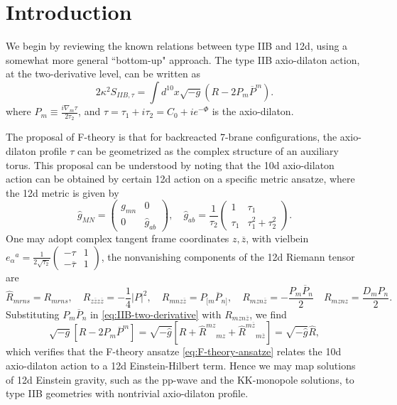 \section{Introduction}
We begin by reviewing the known relations between type IIB and 12d, using a somewhat more general ``bottom-up" approach.
The type IIB axio-dilaton action, at the two-derivative level, can be written as
\begin{equation}
2\kappa^2 S_{IIB,\tau}
= \int d^{10}x \sqrt{-g} \left(R - 2 P_m \overline{P}^m\right).
\label{eq:IIB-two-derivative}
\end{equation}
where $P_m \equiv \frac{i\nabla_m \tau}{2\tau_2}$, and $\tau = \tau_1 + i \tau_2 = C_0 + i e^{-\Phi}$ is the axio-dilaton.

The proposal of F-theory \cite{Vafa:1996xn} is that for backreacted 7-brane configurations, the axio-dilaton profile $\tau$ can be geometrized as the complex structure of an auxiliary torus.
This proposal can be understood by noting that the 10d axio-dilaton action can be obtained by certain 12d action on a specific metric ansatze, where the 12d metric is given by
\begin{equation}
\widehat{g}_{MN}=\begin{pmatrix}
g_{mn} & 0 \\
0 &\widehat{g}_{ab}
\end{pmatrix},\quad
\widehat{g}_{ab}
=\frac{1}{\tau_2}\begin{pmatrix}
1& \tau_1\\
\tau_1 & \tau_1^2+\tau_2^2
\end{pmatrix}.
\label{eq:F-theory-ansatze}
\end{equation}
One may adopt complex tangent frame coordinates $z, \overline{z}$, with vielbein $e_{\alpha}{}^a = \frac{1}{2\sqrt{\tau_2}}\begin{pmatrix}
    -\tau & 1 \\ -\overline{\tau} & 1
\end{pmatrix}$, the nonvanishing components of the 12d Riemann tensor are \cite{Liu:2025uqu}
\begin{equation}
\widehat{R}_{mrns} = R_{mrns},\quad
R_{z\overline{z}z\overline{z}} = -\frac14 |P|^2,\quad
R_{mnz\overline{z}} = P_{[m}\overline{P}_{n]},\quad
R_{mzn\overline{z}} = - \frac{P_m \overline{P}_n}{2}\quad
R_{mznz} = \frac{D_m P_n}{2}.
\label{eq:12d-Riemann-complex}
\end{equation}
Substituting $P_m\overline{P}_n$ in \eqref{eq:IIB-two-derivative} with $R_{mzn\overline{z}}$, we find
\begin{equation}
\sqrt{-g}[R - 2 P_m \overline{P}^m]
=\sqrt{-\widehat{g}}[R + \widehat{R}^{mz}{}_{mz} + \widehat{R}^{m\overline{z}}{}_{m\overline{z}}]
=\sqrt{-\widehat{g}} \widehat{R},
\label{eq:2-derivative-index-splitting}
\end{equation}
which verifies that the F-theory ansatze \eqref{eq:F-theory-ansatze} relates the 10d axio-dilaton action to a 12d Einstein-Hilbert term.
Hence we may map solutions of 12d Einstein gravity, such as the pp-wave \cite{Tseytlin:1996ne} and the KK-monopole \cite{Cheng:2025efp} solutions, to type IIB geometries with nontrivial axio-dilaton profile.

